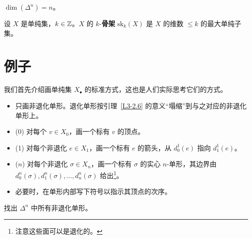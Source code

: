 \begin{example}\label{L3-3.2}
$\dim(\Delta^{n})=n$。
\end{example}

\begin{definition}\label{L3-3.3}
设 $X$ 是单纯集，$k\in\mathbb{Z}$。$X$ 的 $k$-\textbf{骨架} $\mathrm{sk}_{k}(X)$ 是 $X$ 的维数 $\le k$ 的最大单纯子集。
\end{definition}

\section{例子}

\nitem\label{L3-4.1}
我们首先介绍画单纯集 $X_{\bullet}$ 的标准方式，这也是人们实际思考它们的方式。
\begin{itemize}[leftmargin=2.2em,itemsep=0.1em]
\item 只画非退化单形。退化单形按引理~\ref{L3-2.6} 的意义“塌缩”到与之对应的非退化单形上。
\item[]\hspace*{0.8em}(0) 对每个 $v\in X_{0}$，画一个标有 $v$ 的顶点。
\item[]\hspace*{0.8em}(1) 对每个非退化 $e\in X_{1}$，画一个标有 $e$ 的箭头，从 $d^{1}_{0}(e)$ 指向 $d^{1}_{1}(e)$。
\item[]\hspace*{0.8em}($n$) 对每个非退化 $\sigma\in X_{n}$，画一个标有 $\sigma$ 的实心 $n$-单形，其边界由 $d^{n}_{0}(\sigma),d^{n}_{1}(\sigma),\dots,d^{n}_{n}(\sigma)$ 给出\footnote{注意这些面可以是退化的。}。
\item 必要时，在单形内部写下符号以指示其顶点的次序。
\end{itemize}

\begin{exercise}\label{L3-4.2}
找出 $\Delta^{n}$ 中所有非退化单形。
\end{exercise}

\begin{center}
\par{}
\end{center}

